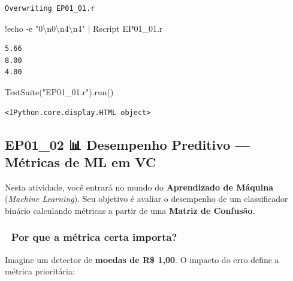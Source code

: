 \documentclass[
  portuguese,
  letterpaper,
  openany,
  oneside,
  12pt,
  a4paper]{book}
\newenvironment{Shaded}{\begin{snugshade}}{\end{snugshade}}
\newcommand{\CharTok}[1]{\textcolor[rgb]{0.13,0.47,0.30}{#1}}
\newcommand{\NormalTok}[1]{\textcolor[rgb]{0.00,0.23,0.31}{#1}}
\newcommand{\OperatorTok}[1]{\textcolor[rgb]{0.37,0.37,0.37}{#1}}
\newcommand{\StringTok}[1]{\textcolor[rgb]{0.13,0.47,0.30}{#1}}
\begin{document}
\begin{verbatim}
Overwriting EP01_01.r
\end{verbatim}

\begin{Shaded}
\begin{Highlighting}[]
\OperatorTok{!}\NormalTok{echo }\OperatorTok{{-}}\NormalTok{e }\StringTok{"0}\CharTok{\textbackslash{}n}\StringTok{0}\CharTok{\textbackslash{}n}\StringTok{4}\CharTok{\textbackslash{}n}\StringTok{4"} \OperatorTok{|}\NormalTok{ Rscript EP01\_01.r}
\end{Highlighting}
\end{Shaded}

\begin{verbatim}
5.66
8.00
4.00
\end{verbatim}

\begin{Shaded}
\begin{Highlighting}[]
\NormalTok{TestSuite(}\StringTok{"EP01\_01.r"}\NormalTok{).run()}
\end{Highlighting}
\end{Shaded}

\begin{verbatim}
<IPython.core.display.HTML object>
\end{verbatim}

\subsection{EP01\_02 📊 Desempenho Preditivo --- Métricas de ML em
VC}\label{ep01_02-desempenho-preditivo-muxe9tricas-de-ml-em-vc}

Nesta atividade, você entrará no mundo do \textbf{Aprendizado de
Máquina} (\emph{Machine Learning}). Seu objetivo é avaliar o desempenho
de um classificador binário calculando métricas a partir de uma
\textbf{Matriz de Confusão}.

\subsubsection{🧠 Por que a métrica certa
importa?}\label{por-que-a-muxe9trica-certa-importa}

Imagine um detector de \textbf{moedas de R\$ 1,00}. O impacto do erro
define a métrica prioritária:
\end{document}
